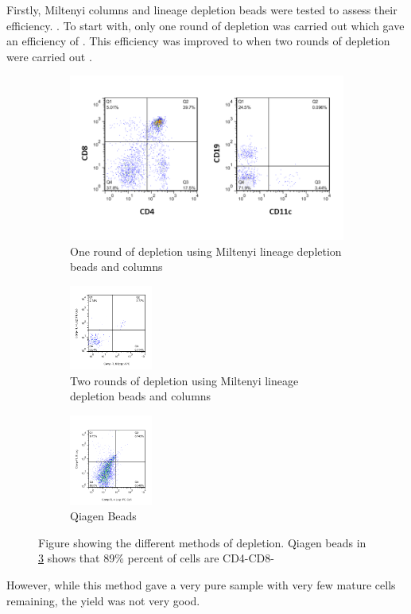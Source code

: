 Firstly, Miltenyi columns and lineage depletion beads were tested to assess their efficiency. 
.
To start with, only one round of depletion was carried out which gave an efficiency of .
This efficiency was improved to  when two rounds of depletion were carried out . 
\begin{figure}
	\begin{subfigure}{\textwidth}
	\includegraphics[width=\textwidth]{Figures/1rounddepletion.png}
	\caption{One round of depletion using Miltenyi lineage depletion beads and columns}
	\end{subfigure}
	\hfill
	\begin{subfigure}{\textwidth}
	\includegraphics[width=0.3\textwidth]{Figures/2rounddepletion.png}
	\caption{Two rounds of depletion using Miltenyi lineage depletion beads and columns}
	\label{subfig:2miltenyi}
	\end{subfigure}
	\hfill
	\begin{subfigure}{\textwidth}
	\includegraphics[width=0.3\textwidth] {Figures/Qiagenbeads.png}
	\caption{Qiagen Beads}
	\label{subfig:Qiagen}
	\end{subfigure}
	
\caption{Figure showing the different methods of depletion. Qiagen beads in \cref{subfig:Qiagen} shows that 89\% percent of cells are CD4-CD8-}
\end{figure}
However, while this method gave a very pure sample with very few mature cells remaining, the yield was not very good.

